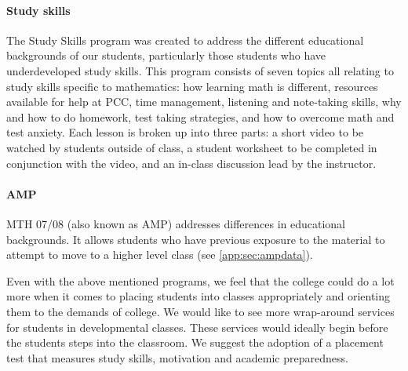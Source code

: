 \paragraph{ Study skills}
The Study Skills program was created to address the different educational
backgrounds of our students, particularly those students who have
underdeveloped study skills. This program consists of seven topics all relating
to study skills specific to mathematics: how learning math is different,
resources available for help at PCC, time management, listening and note-taking
skills, why and how to do homework, test taking strategies, and how to overcome
math and test anxiety.  Each lesson is broken up into three parts: a short
video to be watched by students outside of class, a student worksheet to be
completed in conjunction with the video, and an in-class discussion lead by the
instructor. 

\paragraph{AMP}
MTH 07/08 (also known as AMP) addresses differences in educational backgrounds.
It allows students who have previous exposure to the material to attempt to
move to a higher level class (see \vref{app:sec:ampdata}).

Even with the above mentioned programs, we feel that the college could do a lot
more when it comes to placing students into classes appropriately and orienting
them to the demands of college. We would like to see more wrap-around services
for students in developmental classes. These services would ideally begin
before the students steps into the classroom. We suggest the adoption of a
placement test that measures study skills, motivation and academic
preparedness. 


